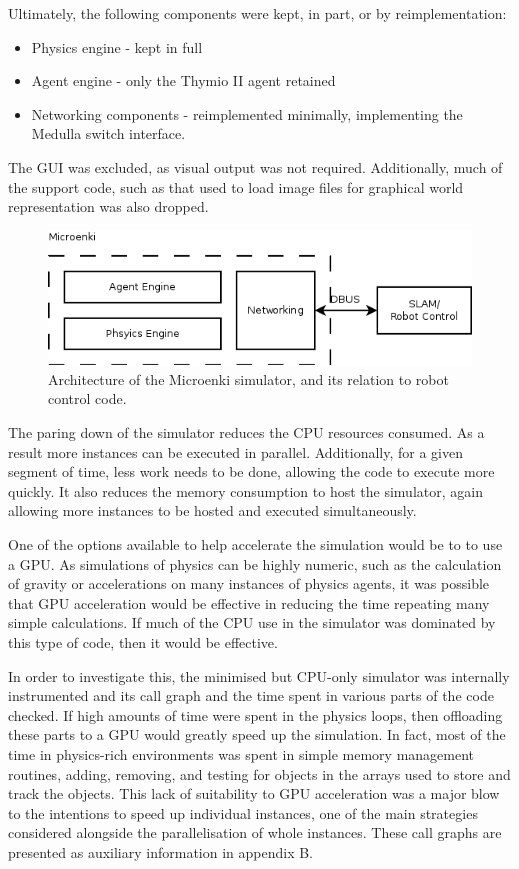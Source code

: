 Ultimately, the following components were kept, in part, or by reimplementation:
\begin{itemize}
    \item Physics engine - kept in full
    \item Agent engine - only the Thymio II agent retained
    \item Networking components - reimplemented minimally, implementing the
        Medulla switch interface.
\end{itemize}
The GUI was excluded, as visual output was not required. Additionally, much of
the support code, such as that used to load image files for graphical world
representation was also dropped.

\begin{figure}[!h]
    \centering
    \includegraphics[width=\textwidth]{microenki.png}
    \caption{Architecture of the Microenki simulator, and its relation to
    robot control code.}
\end{figure}

The paring down of the simulator reduces the CPU resources consumed. As a result
more instances can be executed in parallel. Additionally, for a given segment of
time, less work needs to be done, allowing the code to execute more quickly. It
also reduces the memory consumption to host the simulator, again allowing more
instances to be hosted and executed simultaneously.

One of the options available to help accelerate the simulation would be to to
use a GPU. As simulations of physics can be highly numeric, such as the
calculation of gravity or accelerations on many instances of physics agents,
it was possible that GPU acceleration would be effective in reducing the time
repeating many simple calculations. If much of the CPU use in the simulator was
dominated by this type of code, then it would be effective.

In order to investigate this, the minimised but CPU-only simulator was
internally instrumented and its call graph and the time spent in various parts
of the code checked. If high amounts of time were spent in the physics loops,
then offloading these parts to a GPU would greatly speed up the simulation. In
fact, most of the time in physics-rich environments was spent in simple memory
management routines, adding, removing, and testing for objects in the arrays
used to store and track the objects. This lack of suitability to GPU
acceleration was a major blow to the intentions to speed up individual
instances, one of the main strategies considered alongside the parallelisation
of whole instances. These call graphs are presented as auxiliary information
in appendix B.

